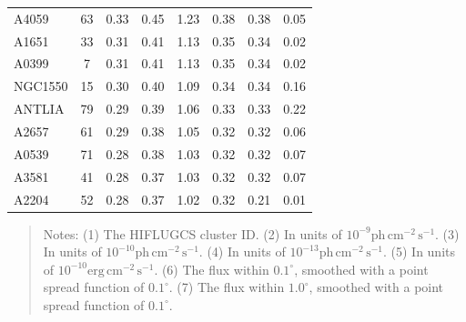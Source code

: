 \documentclass[10pt,aps,pra,reprint,amsmath,amsfonts,amssymb,showpacs,nofootinbib,floatfix]{revtex4-1}
\newcommand{\rmn}{\mathrm}
\begin{document}
\begin{table}
\begin{minipage}{2.0\columnwidth}
\begin{tabular}{l  c c c c c c c}
A4059    &  63 &   0.33 &   0.45 &   1.23 &   0.38 &   0.38 &   0.05 \\
A1651    &  33 &   0.31 &   0.41 &   1.13 &   0.35 &   0.34 &   0.02 \\
A0399    &   7 &   0.31 &   0.41 &   1.13 &   0.35 &   0.34 &   0.02 \\
NGC1550  &  15 &   0.30 &   0.40 &   1.09 &   0.34 &   0.34 &   0.16 \\
ANTLIA   &  79 &   0.29 &   0.39 &   1.06 &   0.33 &   0.33 &   0.22 \\
A2657    &  61 &   0.29 &   0.38 &   1.05 &   0.32 &   0.32 &   0.06 \\
A0539    &  71 &   0.28 &   0.38 &   1.03 &   0.32 &   0.32 &   0.07 \\
A3581    &  41 &   0.28 &   0.37 &   1.03 &   0.32 &   0.32 &   0.07 \\
A2204    &  52 &   0.28 &   0.37 &   1.02 &   0.32 &   0.21 &   0.01 \\
\hline
\hline
\end{tabular}
\begin{quote}
  Notes: 
   (1) The HIFLUGCS cluster ID.
   (2) In units of  $10^{-9} \rmn{ph}\,\rmn{cm}^{-2}\,\rmn{s}^{-1}$.
   (3) In units of  $10^{-10} \rmn{ph}\,\rmn{cm}^{-2}\,\rmn{s}^{-1}$.
   (4) In units of  $10^{-13} \rmn{ph}\,\rmn{cm}^{-2}\,\rmn{s}^{-1}$.
   (5) In units of  $10^{-10} \rmn{erg}\,\rmn{cm}^{-2}\,\rmn{s}^{-1}$.
   (6) The flux within $0.1^\circ$, smoothed with a point spread function of $0.1^\circ$. 
   (7) The flux within $1.0^\circ$, smoothed with a point spread function of $0.1^\circ$. 
 \label{tab:flux_tab_CRs}
  \end{quote}
\end{minipage}
\end{table} 
\end{document}

